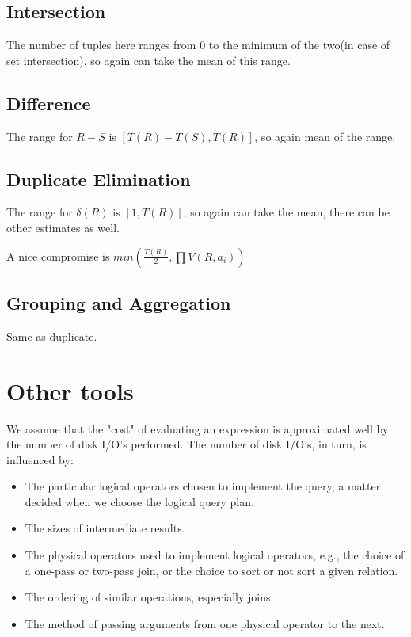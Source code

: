 \subsection{Intersection}
The number of tuples here ranges from $0$ to the minimum of the two(in case of set intersection), so again can take the mean of this range.

\subsection{Difference}
The range for $R-S$ is $[T(R)-T(S),T(R)]$, so again mean of the range.

\subsection{Duplicate Elimination}
The range for $\delta(R)$ is $[1, T(R)]$, so again can take the mean, there can be other estimates as well.
\par A nice compromise is $min(\frac{T(R)}{2}, \prod V(R,a_i))$

\subsection{Grouping and Aggregation}
Same as duplicate.


\section{Other tools}
We assume that the "cost" of evaluating an expression is approximated well by the number of disk I/O's performed. The number of disk I/O's, in turn, is influenced by:
\begin{itemize}
    \item The particular logical operators chosen to implement the query, a matter decided when we choose the logical query plan.
    \item The sizes of intermediate results.
    \item The physical operators used to implement logical operators, e.g., the choice of a one-pass or two-pass join, or the choice to sort or not sort a given relation.
    \item The ordering of similar operations, especially joins.
    \item The method of passing arguments from one physical operator to the next.
\end{itemize}

